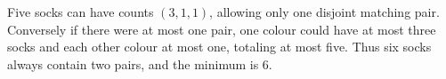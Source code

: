 Five socks can have counts $(3,1,1)$, allowing only one disjoint matching pair. Conversely if there were at most one pair, one colour could have at most three socks and each other colour at most one, totaling at most five. Thus six socks always contain two pairs, and the minimum is $\boxed6$.
